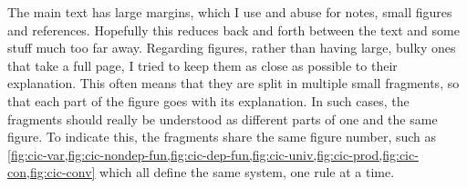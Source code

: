 The main text has large margins, which I use and abuse 
for notes, small figures and references. Hopefully this reduces
back and forth between the text and some stuff much too far away.
Regarding figures, rather than having large, bulky ones that take a full page,
I tried to keep them as close as possible to their explanation. This often means that
they are split in multiple small fragments, so that each part of the figure goes with its
explanation. In such cases, the fragments should really be understood
as different parts of one and the same figure. To indicate this, the fragments share the same
figure number, such as
\cref{fig:cic-var,fig:cic-nondep-fun,fig:cic-dep-fun,fig:cic-univ,fig:cic-prod,fig:cic-con,fig:cic-conv} which all define the same system, one rule at a time.




\begingroup %

\hypersetup{allcolors=.}

\setlength{\textheight}{230\vscale} %

\etocstandarddisplaystyle %
\etocstandardlines %
\setcounter{tocdepth}{\sectiontocdepth} %

\tableofcontents %

\setcounter{tocdepth}{\subsectiontocdepth} %




\endgroup
{}
